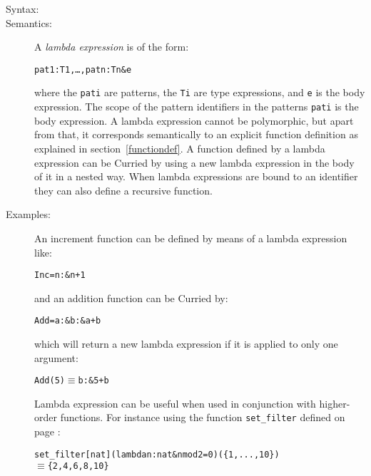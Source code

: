 \documentclass[\pformat,12pt]{article}
\newcommand{\MYEQUIV}{$\equiv$}
\begin{document}
\begin{description}
\item[Syntax:]



        
\item[Semantics:] A {\it lambda expression} is of the form:
  \begin{alltt}
     pat1 : T1, \ldots, patn : Tn \& e
  \end{alltt}
  where the {\tt pati} are patterns, the {\tt Ti} are type expressions, and
  {\tt e} is the body expression. The scope of the pattern identifiers in
  the patterns {\tt pati} is the body expression. A lambda expression
  cannot be polymorphic, but apart from that, it corresponds semantically
  to an explicit function definition as explained in
  section~\ref{functiondef}. A function defined by a lambda expression can
  be Curried by using a new lambda expression in the body of it in a nested
  way. When lambda expressions are bound to an identifier they can also
  define a recursive function.

\item[Examples:] An increment function can be defined by means of a lambda
  expression like:
  \begin{alltt}
    Inc =  n :  \& n + 1
  \end{alltt}
  and an addition function can be Curried by:
  \begin{alltt}
    Add =  a :  \&  b :  \& a + b
  \end{alltt}
  which will return a new lambda expression if it is applied to only one
  argument:
  \begin{alltt}
    Add(5) \(\equiv\)  b :  \& 5 + b
  \end{alltt}
  Lambda expression can be useful when used in conjunction with higher-order 
  functions. For instance using the function \texttt{set\_filter}
  defined on page \pageref{setfilterdef}:
  \begin{alltt}
  set_filter[nat](lambda n:nat & n mod 2 = 0)(\{1,...,10\})
  \MYEQUIV \{2,4,6,8,10\}
  \end{alltt}
\end{description}
\end{document}
